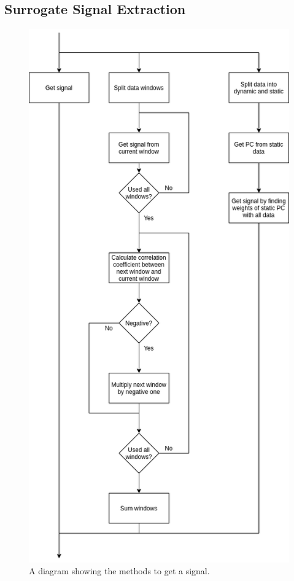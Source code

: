             \subsection{Surrogate Signal Extraction} \label{sec:pca_data_driven_surrogate_signal_extraction_methods_for_dynamic_pet_methods_surrogate_signal_extraction}
                \begin{figure}
                    \centering
                    
                    \includegraphics[width=0.7\linewidth]{figures/data_driven_surrogate_signal_extraction_methods_1_get_signal.png}
                    
                    \captionsetup{singlelinecheck=false, justification=centering}
                    \caption{A diagram showing the methods to get a signal.}
                    \label{fig:pca_data_driven_surrogate_signal_extraction_methods_for_dynamic_pet_methods_get_signal}
                \end{figure}
                
